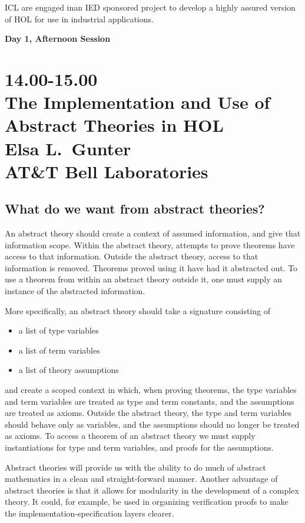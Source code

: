 
\noindent
ICL are engaged inan IED sponsored project to develop a highly assured
version of {\small HOL} for use in industrial applications.

\newpage
\begin{center}\Large\bf
Day 1, Afternoon Session
\end{center}

\section*{14.00-15.00\\
The Implementation and Use of Abstract Theories in HOL\\
Elsa L.~Gunter \\
\large\bf AT\&T Bell Laboratories}

\subsection*{What do we want from abstract theories?}
An abstract theory should create a context of assumed information, and
give that information scope.  Within the abstract theory, attempts to
prove theorems have access to that information.  Outside the abstract
theory, access to that information is removed.  Theorems proved using
it have had it abstracted out.  To use a theorem from within an
abstract theory outside it, one must supply an instance of the
abstracted information.

More specifically, an abstract theory should take a signature
consisting of
\begin{itemize}
\item a list of type variables
\item a list of term variables
\item a list of theory assumptions
\end{itemize}
and create a scoped context in which, when proving theorems, the type
variables and term variables are treated as type and term constants,
and the assumptions are treated as axioms.  Outside the abstract
theory, the type and term variables should behave only as variables,
and the assumptions should no longer be treated as axioms.  To access
a theorem of an abstract theory we must supply instantiations for type
and term variables, and proofs for the assumptions.

Abstract theories will provide us with the ability to do much of
abstract mathematics in a clean and straight-forward manner.  Another
advantage of abstract theories is that it allows for modularity in the
development of a complex theory.  It could, for example, be used in
organizing verification proofs to make the
implementation-specification layers clearer.

